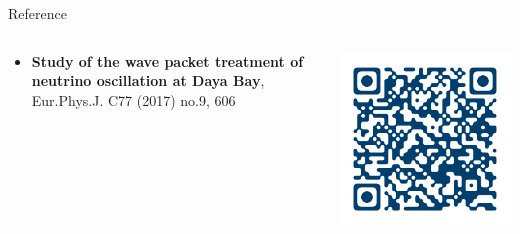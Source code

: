 \documentclass[usenames, dvipsnames]{beamer}
\newcommand{\Important}{\textcolor{BrickRed}}
\newcommand{\impitem}{\item[\Important{$\bullet$}]}
\begin{document}
\begin{frame}[fragile]
\begin{columns}[T]
\begin{column}{.47\textwidth}
\begin{block}{Reference}
    \begin{columns}[T]
        \begin{column}{0.8\textwidth}
            \begin{itemize}
                \impitem \textbf{Study of the wave packet treatment of neutrino
                oscillation at Daya Bay},
                \\ Eur.Phys.J. C77 (2017) no.9, 606
            \end{itemize}
        \end{column}
        \begin{column}{0.2\textwidth}
        \vspace*{-3cm}
        \hspace*{\fill}
        \href{https://link.springer.com/article/10.1140%2Fepjc%2Fs10052-017-4970-y}
        { \includegraphics[scale=0.8]{./pics/paper_qr_nologo.png}}
        \end{column}
    \end{columns}
\end{block}
                
\end{column}


\end{columns}
\end{frame}
\end{document}
